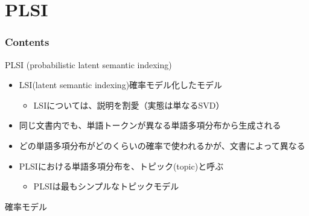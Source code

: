 \documentclass[aspectratio=169,unicode,dvipdfmx,14pt]{beamer}
\begin{document}
\section{PLSI}

\begin{frame}\frametitle{Contents}
\Large \tableofcontents[currentsection]
\end{frame}

\begin{frame}{PLSI (probabilistic latent semantic indexing)}
\begin{itemize}
\item LSI(latent semantic indexing)確率モデル化したモデル
\begin{itemize}
\item LSIについては、説明を割愛（実態は単なるSVD）
\end{itemize}
\item 同じ文書内でも、単語トークンが異なる単語多項分布から生成される
\item どの単語多項分布がどのくらいの確率で使われるかが、文書によって異なる
\item PLSIにおける単語多項分布を、トピック(topic)と呼ぶ
\begin{itemize}
\item PLSIは最もシンプルなトピックモデル
\end{itemize}
\end{itemize}
\end{frame}

\begin{frame}{確率モデル}
\end{frame}
\end{document}
